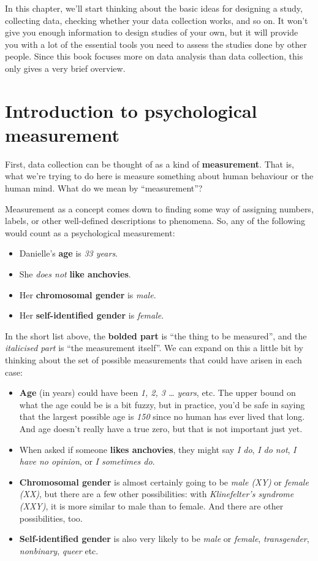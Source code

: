 \documentclass[
  11pt,
]{book}
\providecommand{\tightlist}{%
  \setlength{\itemsep}{0pt}\setlength{\parskip}{0pt}}
\theoremstyle{indenteddefinition}
\theoremstyle{indenteddefinition}
\theoremstyle{definition}
\theoremstyle{definition}
\theoremstyle{remark}
\begin{document}
In this chapter, we'll start thinking about the basic ideas for designing a study, collecting data, checking whether your data collection works, and so on. It won't give you enough information to design studies of your own, but it will provide you with a lot of the essential tools you need to assess the studies done by other people. Since this book focuses more on data analysis than data collection, this only gives a very brief overview.

\hypertarget{measurement}{%
\section{Introduction to psychological measurement}\label{measurement}}

First, data collection can be thought of as a kind of \textbf{measurement}. That is, what we're trying to do here is measure something about human behaviour or the human mind. What do we mean by ``measurement''?

Measurement as a concept comes down to finding some way of assigning numbers, labels, or other well-defined descriptions to phenomena. So, any of the following would count as a psychological measurement:

\begin{itemize}
\tightlist
\item
  Danielle's \textbf{age} is \emph{33 years}.
\item
  She \emph{does not} \textbf{like anchovies}.
\item
  Her \textbf{chromosomal gender} is \emph{male}.
\item
  Her \textbf{self-identified gender} is \emph{female}.
\end{itemize}

In the short list above, the \textbf{bolded part} is ``the thing to be measured'', and the \emph{italicised part} is ``the measurement itself''. We can expand on this a little bit by thinking about the set of possible measurements that could have arisen in each case:

\begin{itemize}
\tightlist
\item
  \textbf{Age} (in years) could have been \emph{1, 2, 3 \ldots{} years}, etc. The upper bound on what the age could be is a bit fuzzy, but in practice, you'd be safe in saying that the largest possible age is \emph{150} since no human has ever lived that long. And age doesn't really have a true zero, but that is not important just yet.
\item
  When asked if someone \textbf{likes anchovies}, they might say \emph{I do}, \emph{I do not}, \emph{I have no opinion}, or \emph{I sometimes do}.
\item
  \textbf{Chromosomal gender} is almost certainly going to be \emph{male (XY)} or \emph{female (XX)}, but there are a few other possibilities: with \emph{Klinefelter's syndrome (XXY)}, it is more similar to male than to female. And there are other possibilities, too.
\item
  \textbf{Self-identified gender} is also very likely to be \emph{male} or \emph{female}, \emph{transgender}, \emph{nonbinary}, \emph{queer} etc.
\end{itemize}
\end{document}
